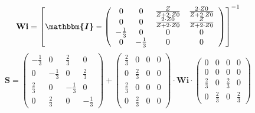 \[ \mathbf{Wi} =  \left[ \boldsymbol{\mathbbm{I}}  -
\left(\begin{array}{cccc} 0 & 0 & \frac{Z}{Z+2\cdot Z0} & \frac{2\cdot
Z0}{Z+2\cdot Z0} \\ 0 & 0 & \frac{2\cdot Z0}{Z+2\cdot Z0} &
\frac{Z}{Z+2\cdot Z0} \\ -\frac{1}{3} & 0 & 0 & 0 \\ 0 & -\frac{1}{3}
& 0 & 0 \end{array}\right) \right]^{-1}  \]
\[ \mathbf{S} = \left(\begin{array}{cccc} -\frac{1}{3} & 0 &
\frac{2}{3} & 0 \\ 0 & -\frac{1}{3} & 0 & \frac{2}{3} \\ \frac{2}{3} &
0 & -\frac{1}{3} & 0 \\ 0 & \frac{2}{3} & 0 & -\frac{1}{3}
\end{array}\right) + \left(\begin{array}{cccc} \frac{2}{3} & 0 & 0 & 0
\\ 0 & \frac{2}{3} & 0 & 0 \\ \frac{2}{3} & 0 & 0 & 0 \\ 0 &
\frac{2}{3} & 0 & 0 \end{array}\right) \cdot \mathbf{Wi}
\cdot\left(\begin{array}{cccc} 0 & 0 & 0 & 0 \\ 0 & 0 & 0 & 0 \\
\frac{2}{3} & 0 & \frac{2}{3} & 0 \\ 0 & \frac{2}{3} & 0 & \frac{2}{3}
\end{array}\right) \]
